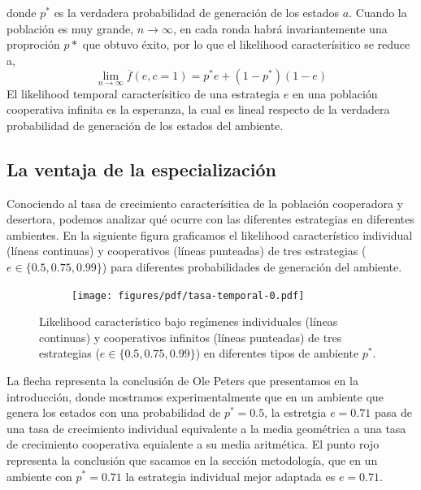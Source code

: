 \documentclass[a4paper,10pt]{article}
\begin{document}
%
donde $p^*$ es la verdadera probabilidad de generación de los estados $a$.
Cuando la población es muy grande, $n\rightarrow \infty$, en cada ronda habrá invariantemente una proproción $p*$ que obtuvo éxito, por lo que el likelihood caracterísitico se reduce a,
%
\begin{equation}
\lim_{n\rightarrow \infty} \overline{f}(e,c=1) = p^* e + (1-p^*)(1-e)
\end{equation}
%
El likelihood temporal caracterísitico de una estrategia $e$ en una población cooperativa infinita es la esperanza, la cual es lineal respecto de la verdadera probabilidad de generación de los estados del ambiente.


\subsection{La ventaja de la especialización}

Conociendo al tasa de crecimiento caracterísitica de la población cooperadora y desertora, podemos analizar qué ocurre con las diferentes estrategias en diferentes ambientes.
En la siguiente figura graficamos el likelihood característico individual (líneas continuas) y cooperativos (líneas punteadas) de tres estrategias ($e \in \{0.5, 0.75, 0.99\}$) para diferentes probabilidades de generación del ambiente.
%
\begin{figure}[H]
    \centering
    \begin{subfigure}[b]{0.66\textwidth}
    \texttt{[image: figures/pdf/tasa-temporal-0.pdf]}
    \end{subfigure}
    \caption{Likelihood característico bajo regímenes individuales (líneas continuas) y cooperativos infinitos (líneas punteadas) de tres estrategias ($e \in \{0.5, 0.75, 0.99\}$) en diferentes tipos de ambiente $p^*$.}
    \label{fig:fitness_temporal}
\end{figure}
%
La flecha representa la conclusión de Ole Peters que presentamos en la introducción, donde mostramos experimentalmente que en un ambiente que genera los estados con una probabilidad de $p^* = 0.5$, la estretgia $e=0.71$ pasa de una tasa de crecimiento individual equivalente a la media geométrica a una tasa de crecimiento cooperativa equialente a su media aritmética.
El punto rojo representa la conclusión que sacamos en la sección metodología, que en un ambiente con $p^*=0.71$ la estrategia individual mejor adaptada es $e=0.71$.
\end{document}
